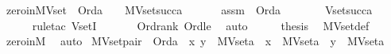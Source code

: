 \begin{isabellebody}
%
\endisadelimproof
\isanewline
{}\isamarkupfalse%
\ zero{\isacharunderscore}{\kern0pt}in{\isacharunderscore}{\kern0pt}MVset\ {\isacharcolon}{\kern0pt}\ {\isachardoublequoteopen}Ord{\isacharparenleft}{\kern0pt}a{\isacharparenright}{\kern0pt}\ {\isasymLongrightarrow}\ {}\ {\isasymin}\ MVset{\isacharparenleft}{\kern0pt}succ{\isacharparenleft}{\kern0pt}a{\isacharparenright}{\kern0pt}{\isacharparenright}{\kern0pt}{\isachardoublequoteclose}\isanewline
%
\isadelimproof
%
\endisadelimproof
%
\isatagproof
{}\isamarkupfalse%
\ {\isacharminus}{\kern0pt}\ \isanewline
\ \ \isamarkupfalse%
\ assm\ {\isacharcolon}{\kern0pt}\ {\isachardoublequoteopen}Ord{\isacharparenleft}{\kern0pt}a{\isacharparenright}{\kern0pt}{\isachardoublequoteclose}\isanewline
\ \ \isamarkupfalse%
\ \isamarkupfalse%
\ {\isachardoublequoteopen}{}\ {\isasymin}\ Vset{\isacharparenleft}{\kern0pt}succ{\isacharparenleft}{\kern0pt}a{\isacharparenright}{\kern0pt}{\isacharparenright}{\kern0pt}{\isachardoublequoteclose}\ \isanewline
\ \ \ \ \isamarkupfalse%
\ {\isacharparenleft}{\kern0pt}rule{\isacharunderscore}{\kern0pt}tac\ VsetI{\isacharparenright}{\kern0pt}\ \isanewline
\ \ \ \ \isamarkupfalse%
\ Ord{\isacharunderscore}{\kern0pt}rank\ Ord{\isacharunderscore}{\kern0pt}{}{\isacharunderscore}{\kern0pt}le\ \isamarkupfalse%
\ auto\isanewline
\ \ \isamarkupfalse%
\ \isamarkupfalse%
\ {\isacharquery}{\kern0pt}thesis\ \isamarkupfalse%
\ MVset{\isacharunderscore}{\kern0pt}def\ \isamarkupfalse%
\ zero{\isacharunderscore}{\kern0pt}in{\isacharunderscore}{\kern0pt}M\ \isamarkupfalse%
\ auto\isanewline
{}\isamarkupfalse%
%
\endisatagproof
{\isafoldproof}%
%
\isadelimproof
\isanewline
%
\endisadelimproof
\isanewline
{}\isamarkupfalse%
\ MVset{\isacharunderscore}{\kern0pt}pair\ {\isacharcolon}{\kern0pt}\ {\isachardoublequoteopen}Ord{\isacharparenleft}{\kern0pt}a{\isacharparenright}{\kern0pt}\ {\isasymLongrightarrow}\ {\isacharless}{\kern0pt}x{\isacharcomma}{\kern0pt}\ y{\isachargreater}{\kern0pt}\ {\isasymin}\ MVset{\isacharparenleft}{\kern0pt}a{\isacharparenright}{\kern0pt}\ {\isasymLongrightarrow}\ x\ {\isasymin}\ MVset{\isacharparenleft}{\kern0pt}a{\isacharparenright}{\kern0pt}\ {\isasymand}\ y\ {\isasymin}\ MVset{\isacharparenleft}{\kern0pt}a{\isacharparenright}{\kern0pt}{\isachardoublequoteclose}\ \isanewline
%
\isadelimproof
\ \ %

\end{isabellebody}
